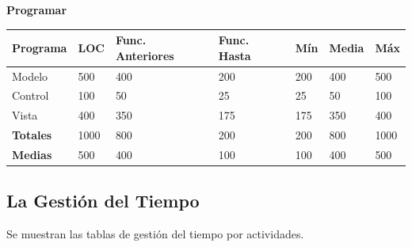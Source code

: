 \documentclass[a4paper,12pt,openany,oneside]{book}
\begin{document}
\textbf{Programar}\\
\begin{tabular}{| l | l | l | l | l | l | l |}
\hline
\textbf{Programa} & \textbf{LOC} & \textbf{Func. Anteriores} & \textbf{Func. Hasta} & \textbf{Mín} & \textbf{Media} & \textbf{Máx}\\
\hline
Modelo & 			500  & 400 & 200 & 200 & 400 & 500 \\
\hline
Control &			100  & 50  & 25  & 25  & 50  & 100 \\
\hline
Vista &  			400  & 350 & 175 & 175 & 350 & 400\\
\hline
\textbf{Totales} &	1000 & 800 & 200 & 200 & 800 & 1000 \\
\hline
\textbf{Medias} & 	500	 & 400 & 100 & 100 & 400 & 500\\
\hline
\end{tabular}
\subsection{La Gestión del Tiempo}
Se muestran las tablas de gestión del tiempo por actividades.
\end{document}
